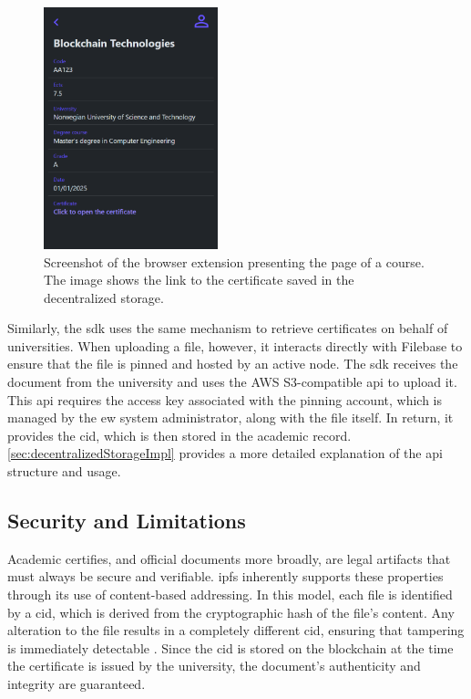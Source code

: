 \begin{figure}
  \centering
  \includegraphics[width=0.45\textwidth]{figures/SingleCourseWithCertificate.png}
  \caption[Browser extension screenshot with certificate link]{Screenshot of the browser extension presenting the page of a course. The image shows the link to the certificate saved in the decentralized storage.}
  \label{fig:courseWithCertificate}
\end{figure}

Similarly, the \gls{sdk} uses the same mechanism to retrieve certificates on behalf of universities. When uploading a file, however, it interacts directly with Filebase to ensure that the file is pinned and hosted by an active node. The \gls{sdk} receives the document from the university and uses the AWS S3-compatible \gls{api} to upload it. This \gls{api} requires the access key associated with the pinning account, which is managed by the \gls{ew} system administrator, along with the file itself. In return, it provides the \gls{cid}, which is then stored in the academic record. \cref{sec:decentralizedStorageImpl} provides a more detailed explanation of the \gls{api} structure and usage.

\subsection{Security and Limitations}
Academic certifies, and official documents more broadly, are legal artifacts that must always be secure and verifiable. \gls{ipfs} inherently supports these properties through its use of content-based addressing. In this model, each file is identified by a \gls{cid}, which is derived from the cryptographic \gls{hash} of the file's content. Any alteration to the file results in a completely different \gls{cid}, ensuring that tampering is immediately detectable \cite{benet2014ipfscontentaddressed}. Since the \gls{cid} is stored on the blockchain at the time the certificate is issued by the university, the document's authenticity and integrity are guaranteed.

